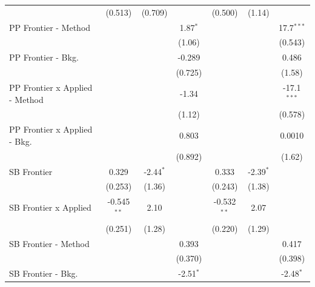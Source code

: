 \begin{tabular}{lcccccc}
                                  & (0.513)        & (0.709)      &               & (0.500)        & (1.14)       &   \\   
   PP Frontier - Method           &                &              & 1.87$^{*}$    &                &              & 17.7$^{***}$\\   
                                  &                &              & (1.06)        &                &              & (0.543)\\   
   PP Frontier - Bkg.             &                &              & -0.289        &                &              & 0.486\\   
                                  &                &              & (0.725)       &                &              & (1.58)\\   
   PP Frontier x Applied - Method &                &              & -1.34         &                &              & -17.1$^{***}$\\   
                                  &                &              & (1.12)        &                &              & (0.578)\\   
   PP Frontier x Applied - Bkg.   &                &              & 0.803         &                &              & 0.0010\\   
                                  &                &              & (0.892)       &                &              & (1.62)\\   
   SB Frontier                    & 0.329          & -2.44$^{*}$  &               & 0.333          & -2.39$^{*}$  &   \\   
                                  & (0.253)        & (1.36)       &               & (0.243)        & (1.38)       &   \\   
   SB Frontier x Applied          & -0.545$^{**}$  & 2.10         &               & -0.532$^{**}$  & 2.07         &   \\   
                                  & (0.251)        & (1.28)       &               & (0.220)        & (1.29)       &   \\   
   SB Frontier - Method           &                &              & 0.393         &                &              & 0.417\\   
                                  &                &              & (0.370)       &                &              & (0.398)\\   
   SB Frontier - Bkg.             &                &              & -2.51$^{*}$   &                &              & -2.48$^{*}$\\   

\end{tabular}
